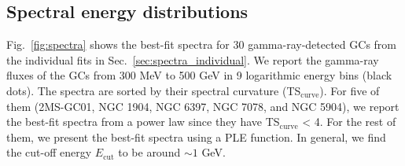 \documentclass[doublespace,nopageskip]{VTthesis} %
\begin{document}
\begin{appendices}


\section{Spectral energy distributions}\label{appx:spectra}

Fig.~\ref{fig:spectra} shows the best-fit spectra for 30 gamma-ray-detected GCs from the individual fits in Sec.~\ref{sec:spectra_individual}. We report the gamma-ray fluxes of the GCs from 300 MeV to 500 GeV in 9 logarithmic energy bins (black dots). The spectra are sorted by their spectral curvature (TS$_\mathrm{curve}$). For five of them (2MS-GC01, NGC 1904, NGC 6397, NGC 7078, and NGC 5904), we report the best-fit spectra from a power law since they have TS$_\mathrm{curve}$ < 4. For the rest of them, we present the best-fit spectra using a PLE function. In general, we find the cut-off energy $E_\mathrm{cut}$ to be around $\sim 1$ GeV.


\end{appendices}
\end{document}
